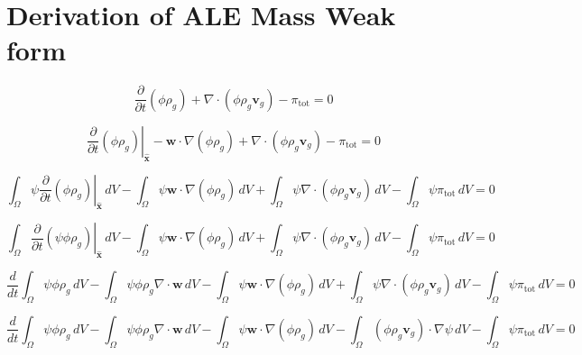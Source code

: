 \documentclass[11pt]{article}
\begin{document}
\section{Derivation of ALE Mass Weak form}

\begin{equation}
\frac{\partial}{\partial t}\left(\phi \rho_g\right)
+ \nabla \cdot
\left(
\phi \rho_g \mathbf{v}_g
\right)
- \pi_{\mathrm{tot}}
= 0
\end{equation}

\begin{equation}
\left.\frac{\partial}{\partial t}\left(\phi \rho_g\right)\right|_{\widehat{\mathbf{x}}}
- \mathbf{w}\cdot\nabla\left(\phi \rho_g\right)
+ \nabla \cdot
\left(
\phi \rho_g \mathbf{v}_g
\right)
- \pi_{\mathrm{tot}}
= 0
\end{equation}

\begin{equation}
\int_{\Omega} \psi \left.\frac{\partial}{\partial t}\left(\phi \rho_g\right)\right|_{\widehat{\mathbf{x}}} \,dV
- \int_{\Omega} \psi \mathbf{w}\cdot\nabla\left(\phi \rho_g\right) \,dV
+  \int_{\Omega} \psi \nabla \cdot
\left(
\phi \rho_g \mathbf{v}_g
\right) \,dV
- \int_{\Omega} \psi \pi_{\mathrm{tot}} \,dV
= 0
\end{equation}

\begin{equation}
\int_{\Omega} \left.\frac{\partial}{\partial t}\left(\psi \phi \rho_g\right)\right|_{\widehat{\mathbf{x}}} \,dV
- \int_{\Omega} \psi \mathbf{w}\cdot\nabla\left(\phi \rho_g\right) \,dV
+  \int_{\Omega} \psi \nabla \cdot
\left(
\phi \rho_g \mathbf{v}_g
\right) \,dV
- \int_{\Omega} \psi \pi_{\mathrm{tot}} \,dV
= 0
\end{equation}

\begin{equation}
\frac{d}{dt} \int_{\Omega} \psi \phi \rho_g \,dV
- \int_{\Omega} \psi\phi \rho_g \nabla \cdot \mathbf{w} \,dV
- \int_{\Omega} \psi \mathbf{w}\cdot\nabla\left(\phi \rho_g\right) \,dV
+  \int_{\Omega} \psi \nabla \cdot
\left(
\phi \rho_g \mathbf{v}_g
\right) \,dV
- \int_{\Omega} \psi \pi_{\mathrm{tot}} \,dV
= 0
\end{equation}

\begin{equation}
\frac{d}{dt} \int_{\Omega} \psi \phi \rho_g \,dV
- \int_{\Omega} \psi\phi \rho_g \nabla \cdot \mathbf{w} \,dV
- \int_{\Omega} \psi \mathbf{w}\cdot\nabla\left(\phi \rho_g\right) \,dV
-  \int_{\Omega} \left(
\phi \rho_g \mathbf{v}_g
\right) \cdot \nabla \psi \,dV
- \int_{\Omega} \psi \pi_{\mathrm{tot}} \,dV
= 0
\end{equation}
\end{document}
